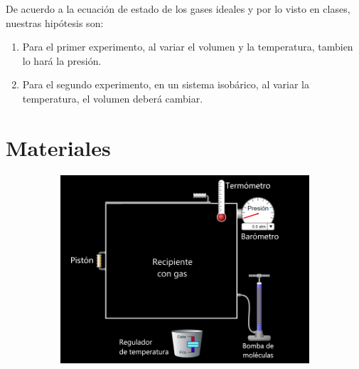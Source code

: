 \documentclass[]{article}
\begin{document}
De acuerdo a la ecuación de estado de los gases ideales y por lo visto en clases, nuestras hipótesis son:
\begin{enumerate}
      \item Para el primer experimento, al variar el volumen y la temperatura, tambien lo hará la presión.
      \item Para el segundo experimento, en un sistema isobárico, al variar la temperatura, el volumen deberá cambiar.
\end{enumerate}

\newpage
\section{Materiales}
\begin{figure}[h!]
      \centering
      \includegraphics[width= 12cm, height= 7cm]{imag/Materiales.png}
\end{figure}


\end{document}
